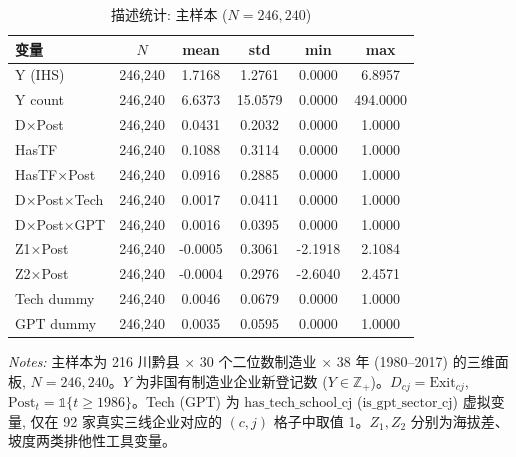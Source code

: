 \begin{table}[htbp]
\centering
\small
\caption{描述统计: 主样本 ($N=246{,}240$)}
\label{tab:descstats}
\begin{tabular}{lccccc}
\hline\hline
变量 & $N$ & mean & std & min & max \\
\hline
Y (IHS) & 246,240 & 1.7168 & 1.2761 & 0.0000 & 6.8957 \\
Y count & 246,240 & 6.6373 & 15.0579 & 0.0000 & 494.0000 \\
D×Post & 246,240 & 0.0431 & 0.2032 & 0.0000 & 1.0000 \\
HasTF & 246,240 & 0.1088 & 0.3114 & 0.0000 & 1.0000 \\
HasTF×Post & 246,240 & 0.0916 & 0.2885 & 0.0000 & 1.0000 \\
D×Post×Tech & 246,240 & 0.0017 & 0.0411 & 0.0000 & 1.0000 \\
D×Post×GPT & 246,240 & 0.0016 & 0.0395 & 0.0000 & 1.0000 \\
Z1×Post & 246,240 & -0.0005 & 0.3061 & -2.1918 & 2.1084 \\
Z2×Post & 246,240 & -0.0004 & 0.2976 & -2.6040 & 2.4571 \\
Tech dummy & 246,240 & 0.0046 & 0.0679 & 0.0000 & 1.0000 \\
GPT dummy & 246,240 & 0.0035 & 0.0595 & 0.0000 & 1.0000 \\
\hline\hline
\end{tabular}
\begin{flushleft}\footnotesize
\textit{Notes:} 主样本为 216 川黔县 × 30 个二位数制造业 × 38 年 (1980--2017) 的三维面板, $N=246{,}240$。$Y$ 为非国有制造业企业新登记数 ($Y\in\mathbb{Z}_{+}$)。$D_{cj}=\mathrm{Exit}_{cj}$, $\mathrm{Post}_t=\mathbb{1}\{t\geq 1986\}$。Tech (GPT) 为 $\mathrm{has\_tech\_school\_cj}$ ($\mathrm{is\_gpt\_sector\_cj}$) 虚拟变量, 仅在 92 家真实三线企业对应的 $(c,j)$ 格子中取值 1。$Z_1, Z_2$ 分别为海拔差、坡度两类排他性工具变量。
\end{flushleft}
\end{table}
